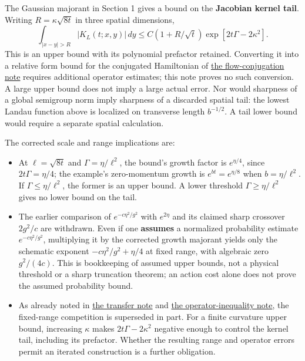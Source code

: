 \documentclass[11pt,a4paper]{article}
\newcommand{\tightlist}{\setlength{\itemsep}{0pt}\setlength{\parskip}{0pt}}
\begin{document}
The Gaussian majorant in Section 1 gives a bound on the \textbf{Jacobian
kernel tail}. Writing \(R=\kappa\sqrt{8t}\) in three spatial dimensions,
\[\int_{|x-y|>R}|K_L(t;x,y)|\,dy
\le C(1+R/\sqrt t)\exp[2t\Gamma-2\kappa^2].\] This is an upper bound
with its polynomial prefactor retained. Converting it into a relative
form bound for the conjugated Hamiltonian of
\href{flow-conjugation-truncation.md}{the flow-conjugation note}
requires additional operator estimates; this note proves no such
conversion. A large upper bound does not imply a large actual error. Nor
would sharpness of a global semigroup norm imply sharpness of a
discarded spatial tail: the lowest Landau function above is localized on
transverse length \(b^{-1/2}\). A tail lower bound would require a
separate spatial calculation.

The corrected scale and range implications are:

\begin{itemize}
\tightlist
\item
  At \(\ell=\sqrt{8t}\) and \(\Gamma=\eta/\ell^2\), the bound's growth
  factor is \(e^{\eta/4}\), since \(2t\Gamma=\eta/4\); the example's
  zero-momentum growth is \(e^{bt}=e^{\eta/8}\) when \(b=\eta/\ell^2\).
  If \(\Gamma\le\eta/\ell^2\), the former is an upper bound. A lower
  threshold \(\Gamma\ge\eta/\ell^2\) gives no lower bound on the tail.
\item
  The earlier comparison of \(e^{-c\eta^2/g^2}\) with \(e^{2\eta}\) and
  its claimed sharp crossover \(2g^2/c\) are withdrawn. Even if one
  \textbf{assumes} a normalized probability estimate
  \(e^{-c\eta^2/g^2}\), multiplying it by the corrected growth majorant
  yields only the schematic exponent \(-c\eta^2/g^2+\eta/4\) at fixed
  range, with algebraic zero \(g^2/(4c)\). This is bookkeeping of
  assumed upper bounds, not a physical threshold or a sharp truncation
  theorem; an action cost alone does not prove the assumed probability
  bound.
\item
  As already noted in \href{ground-state-measure-transfer.md}{the
  transfer note} and \href{large-field-operator-inequality.md}{the
  operator-inequality note}, the fixed-range competition is superseded
  in part. For a finite curvature upper bound, increasing \(\kappa\)
  makes \(2t\Gamma-2\kappa^2\) negative enough to control the kernel
  tail, including its prefactor. Whether the resulting range and
  operator errors permit an iterated construction is a further
  obligation.
\end{itemize}
\end{document}
